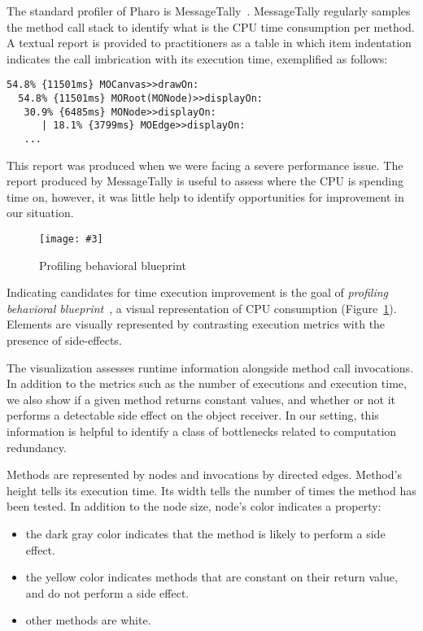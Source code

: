 \documentclass[runningheads]{llncs}
\newcommand{\fig}[4]{
	\begin{figure}[#1]
		\centering
		\texttt{[image: \#3]}
		\caption{\label{fig:#3}#4}
	\end{figure}}
\newcommand{\figref}[1]{Figure~\ref{fig:#1}}
\newcommand{\myparagraph}[1]{\noindent \textbf{#1.}}
\begin{document}
The standard profiler of Pharo is MessageTally~\cite{Berg11d}. MessageTally regularly samples the method call stack to identify what is the CPU time consumption per method. A textual report is provided to practitioners as a table in which item indentation indicates the call imbrication with its execution time, exemplified as follows: 

\begin{lstlisting}
54.8% {11501ms} MOCanvas>>drawOn: 
  54.8% {11501ms} MORoot(MONode)>>displayOn: 
   30.9% {6485ms} MONode>>displayOn: 
      | 18.1% {3799ms} MOEdge>>displayOn: 
   ...
\end{lstlisting}

This report was produced when we were facing a severe performance issue. The report produced by MessageTally is useful to assess where the CPU is spending time on, however, it was little help to identify opportunities for improvement in our situation. 

\fig{}{1.0}{ProfilingBlueprint}{Profiling behavioral blueprint}
Indicating candidates for time execution improvement is the goal of \emph{profiling behavioral blueprint}~\cite{Berg10c}, a visual representation of CPU consumption (\figref{ProfilingBlueprint}). Elements are visually represented by contrasting execution metrics with the presence of side-effects.

The visualization assesses runtime information alongside method call invocations. In addition to the metrics such as the number of executions and execution time, we also show if a given method returns constant values, and whether or not it performs a detectable side effect on the object receiver. In our setting, this information is helpful to identify a class of bottlenecks related to computation redundancy.

Methods are represented by nodes and invocations by directed edges. Method's height tells its execution time. Its width tells the number of times the method has been tested. In addition to the node size, node's color indicates a property:
\begin{itemize}
\item the dark gray color indicates that the method is likely to perform a side effect. 
\item the yellow color indicates methods that are constant on their return value, and do not perform a side effect.
\item other methods are white.
\end{itemize}
\end{document}
